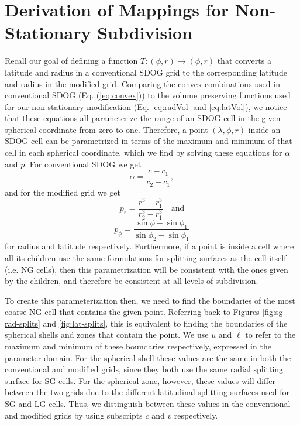 \section{Derivation of Mappings for Non-Stationary Subdivision} \label{app:map}
Recall our goal of defining a function $T \colon (\phi, r) \rightarrow (\phi, r)$ that converts a latitude and radius in a conventional SDOG grid to the corresponding latitude and radius in the modified grid. Comparing the convex combinations used in conventional SDOG (Eq. (\ref{eq:convex})) to the volume preserving functions used for our non-stationary modification (Eq. \ref{eq:radVol} and \ref{eq:latVol}), we notice that these equations all parameterize the range of an SDOG cell in the given spherical coordinate from zero to one. Therefore, a point $(\lambda, \phi, r)$ inside an SDOG cell can be parametrized in terms of the maximum and minimum of that cell in each spherical coordinate, which we find by solving these equations for $\alpha$ and $p$. For conventional SDOG we get
%
\begin{equation*}
\alpha = \frac{c - c_{1}}{c_{2} - c_{1}},
\end{equation*}
%
and for the modified grid we get
%
\begin{equation*}
p_{r} = \frac{r^{3} - r_{1}^{3}}{r_{2}^{3} - r_{1}^{3}} \quad \text{and}
\end{equation*}
%
\begin{equation*}
p_{\phi} = \frac{\sin \phi - \sin \phi_{1}}{\sin \phi_{2} - \sin \phi_{1}}
\end{equation*}
%
for radius and latitude respectively. Furthermore, if a point is inside a cell where all its children use the same formulations for splitting surfaces as the cell itself (i.e. NG cells), then this parametrization will be consistent with the ones given by the children, and therefore be consistent at all levels of subdivision.

To create this parameterization then, we need to find the boundaries of the most coarse NG cell that contains the given point. Referring back to Figures \ref{fig:sg-rad-splits} and \ref{fig:lat-splits}, this is equivalent to finding the boundaries of the spherical shells and zones that contain the point. We use $u$ and $\ell$ to refer to the maximum and minimum of these boundaries respectively, expressed in the parameter domain. For the spherical shell these values are the same in both the conventional and modified grids, since they both use the same radial splitting surface for SG cells. For the spherical zone, however, these values will differ between the two grids due to the different latitudinal splitting surfaces used for SG and LG cells. Thus, we distinguish between these values in the conventional and modified grids by using subscripts $c$ and $v$ respectively.

